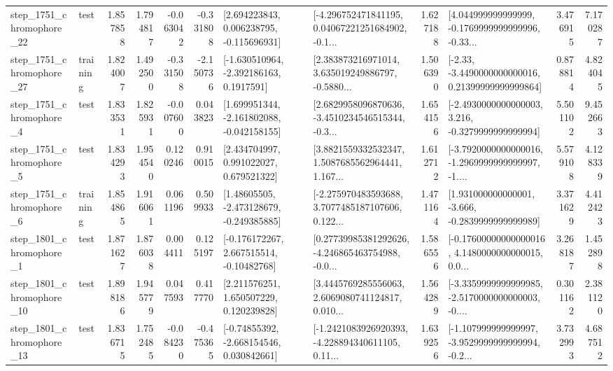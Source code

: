 \begin{tabular}{llrrrrllrlrr}
 step\_1751\_chromophore\_22 &      test &      1.857858 &    1.794817 &     -0.063042 & -0.331808 &    [2.694223843, 0.006238795, -0.115696931] &  [-4.296752471841195, 0.04067221251684902, -0.1... &       1.627188 &  [4.044999999999999, -0.1769999999999996, -0.33... &            3.476915 &          7.170287 \\
 step\_1751\_chromophore\_27 &  training &      1.824007 &    1.492500 &     -0.331508 & -2.150736 &     [-1.630510964, -2.392186163, 0.1917591] &  [2.383873216971014, 3.635019249886797, -0.5880... &       1.506390 &  [-2.33, -3.4490000000000016, 0.21399999999999864] &            0.878814 &          4.824045 \\
  step\_1751\_chromophore\_4 &      test &      1.833531 &    1.825931 &     -0.007600 &  0.043823 &   [1.699951344, -2.161802088, -0.042158155] &  [2.6829958096870636, -3.4510234546515344, -0.3... &       1.654156 &  [-2.4930000000000003, 3.216, -0.3279999999999994] &            5.501102 &          9.452663 \\
  step\_1751\_chromophore\_5 &      test &      1.834293 &    1.954540 &      0.120246 &  0.910015 &     [2.434704997, 0.991022027, 0.679521322] &  [3.8821559332532347, 1.5087685562964441, 1.167... &       1.612712 &  [-3.7920000000000016, -1.2969999999999997, -1.... &            5.579108 &          4.128339 \\
  step\_1751\_chromophore\_6 &  training &      1.854865 &    1.916061 &      0.061196 &  0.509933 &    [1.48605505, -2.473128679, -0.249385885] &  [-2.275970483593688, 3.7077485187107606, 0.122... &       1.471164 &   [1.931000000000001, -3.666, -0.2839999999999989] &            3.371629 &          4.412423 \\
  step\_1801\_chromophore\_1 &      test &      1.871627 &    1.876038 &      0.004411 &  0.125197 &    [-0.176172267, 2.667515514, -0.10482768] &  [0.27739985381292626, -4.246865463754988, -0.0... &       1.586556 &  [-0.17600000000000016, 4.1480000000000015, 0.0... &            3.268187 &          1.452898 \\
 step\_1801\_chromophore\_10 &      test &      1.898186 &    1.945779 &      0.047593 &  0.417770 &     [2.211576251, 1.650507229, 0.120239828] &  [3.4445769285556063, 2.6069080741124817, 0.010... &       1.564289 &  [-3.3359999999999985, -2.5170000000000003, -0.... &            0.301162 &          2.381120 \\
 step\_1801\_chromophore\_13 &      test &      1.836715 &    1.752485 &     -0.084230 & -0.475365 &    [-0.74855392, -2.668154546, 0.030842661] &  [-1.2421083926920393, -4.228894340611105, 0.11... &       1.639256 &  [-1.107999999999997, -3.9529999999999994, -0.2... &            3.732993 &          4.687512 \\

\end{tabular}
